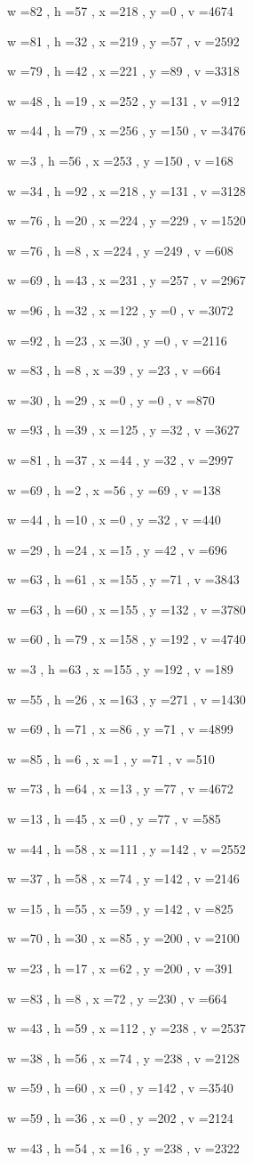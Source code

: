 \documentclass[11pt]{article}
\begin{document}
w =82 , h =57 , x =218 , y =0 , v =4674
\par
w =81 , h =32 , x =219 , y =57 , v =2592
\par
w =79 , h =42 , x =221 , y =89 , v =3318
\par
w =48 , h =19 , x =252 , y =131 , v =912
\par
w =44 , h =79 , x =256 , y =150 , v =3476
\par
w =3 , h =56 , x =253 , y =150 , v =168
\par
w =34 , h =92 , x =218 , y =131 , v =3128
\par
w =76 , h =20 , x =224 , y =229 , v =1520
\par
w =76 , h =8 , x =224 , y =249 , v =608
\par
w =69 , h =43 , x =231 , y =257 , v =2967
\par
w =96 , h =32 , x =122 , y =0 , v =3072
\par
w =92 , h =23 , x =30 , y =0 , v =2116
\par
w =83 , h =8 , x =39 , y =23 , v =664
\par
w =30 , h =29 , x =0 , y =0 , v =870
\par
w =93 , h =39 , x =125 , y =32 , v =3627
\par
w =81 , h =37 , x =44 , y =32 , v =2997
\par
w =69 , h =2 , x =56 , y =69 , v =138
\par
w =44 , h =10 , x =0 , y =32 , v =440
\par
w =29 , h =24 , x =15 , y =42 , v =696
\par
w =63 , h =61 , x =155 , y =71 , v =3843
\par
w =63 , h =60 , x =155 , y =132 , v =3780
\par
w =60 , h =79 , x =158 , y =192 , v =4740
\par
w =3 , h =63 , x =155 , y =192 , v =189
\par
w =55 , h =26 , x =163 , y =271 , v =1430
\par
w =69 , h =71 , x =86 , y =71 , v =4899
\par
w =85 , h =6 , x =1 , y =71 , v =510
\par
w =73 , h =64 , x =13 , y =77 , v =4672
\par
w =13 , h =45 , x =0 , y =77 , v =585
\par
w =44 , h =58 , x =111 , y =142 , v =2552
\par
w =37 , h =58 , x =74 , y =142 , v =2146
\par
w =15 , h =55 , x =59 , y =142 , v =825
\par
w =70 , h =30 , x =85 , y =200 , v =2100
\par
w =23 , h =17 , x =62 , y =200 , v =391
\par
w =83 , h =8 , x =72 , y =230 , v =664
\par
w =43 , h =59 , x =112 , y =238 , v =2537
\par
w =38 , h =56 , x =74 , y =238 , v =2128
\par
w =59 , h =60 , x =0 , y =142 , v =3540
\par
w =59 , h =36 , x =0 , y =202 , v =2124
\par
w =43 , h =54 , x =16 , y =238 , v =2322
\par
\newpage
\end{document}
